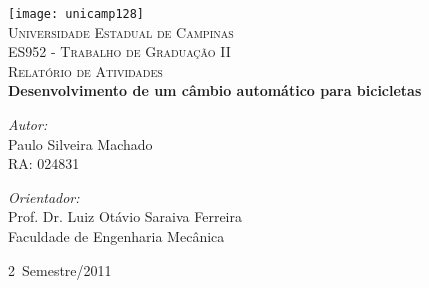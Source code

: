 %
%
%
% 
% 
%
\begin{titlepage}
\begin{center}
 
\texttt{[image: unicamp128]}\\[1cm]
\textsc{\LARGE Universidade Estadual de Campinas}\\[0.3cm]
\textsc{\LARGE ES952 - Trabalho de Graduação II}\\[3.0cm] 
\textsc{\Large Relatório de Atividades} \\[0.2cm]

  
\hfill
\textsf{ \LARGE \bfseries Desenvolvimento de um câmbio automático para
bicicletas}

\vfill
\begin{minipage}{0.49\textwidth}
\begin{flushleft} \large
\emph{Autor:}\\
Paulo Silveira Machado \\
RA: 024831
\end{flushleft}
\end{minipage}
\begin{minipage}{0.5\textwidth}
\begin{flushright} \large
\emph{Orientador:} \\
Prof. Dr. Luiz Otávio Saraiva Ferreira\\
Faculdade de Engenharia Mecânica
\end{flushright}
\end{minipage}
 
\vfill
 
{\large 2\textordmasculine ~Semestre/2011}
\end{center}
 
\end{titlepage}

\tableofcontents
\pagebreak

\listoffigures


\listoftables
\pagebreak